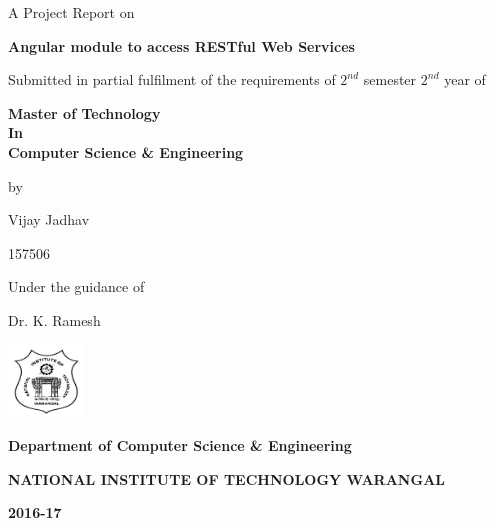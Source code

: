 \begin{titlepage}
	\centering
	
	{\small A Project Report on \par}	
	\vspace{0.4em}
	
	{\LARGE \bfseries{Angular module to access RESTful Web Services} \par}
	\vspace{0.8em}

	{\small Submitted in partial fulfilment of the requirements of $2^{nd}$ semester $2^{nd}$ year of \par}	
	\vspace{0.4em}	
	
	
	{\large \textbf{Master of Technology}\\ \textbf{In} \\ \textbf{Computer Science \& Engineering} \par}
	\vspace{0.4em}
	
	{\small by \par}	
	\vspace{0.4em}
	{\large Vijay Jadhav \par}
	{\large 157506 \par}
	\vspace{1cm}
	
	{\small Under the guidance of\par}
	\vspace{0.5cm}
	{\large Dr. K. Ramesh\par}
	\vspace{1cm}
	
	\includegraphics[width=0.15\textwidth]{files/figures/nitw_logo.png}\par\vspace{0.7cm}
	
	{\large \textbf{Department of Computer Science \& Engineering}\\}

	{\large \textbf{NATIONAL INSTITUTE OF TECHNOLOGY
WARANGAL}\\}

	{\large \textbf{2016-17}\par}

\end{titlepage}
